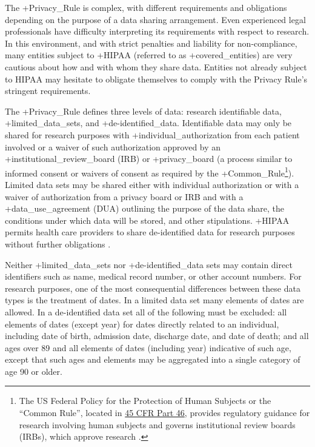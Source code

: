 \documentclass[
]{WileySix}
\begin{document}
The +Privacy\_Rule\textbar{} is complex, with different requirements and obligations depending on the purpose of a data sharing arrangement. Even experienced legal professionals have difficulty interpreting its requirements with respect to research. In this environment, and with strict penalties and liability for non-compliance, many entities subject to +HIPAA\textbar{} (referred to as +covered\_entities\textbar) are very cautious about how and with whom they share data. Entities not already subject to HIPAA may hesitate to obligate themselves to comply with the Privacy Rule's stringent requirements.

The +Privacy\_Rule\textbar{} defines three levels of data: research identifiable data, +limited\_data\_sets\textbar, and +de-identified\_data\textbar. Identifiable data may only be shared for research purposes with +individual\_authorization\textbar{} from each patient involved or a waiver of such authorization approved by an +institutional\_review\_board\textbar{} (IRB) or +privacy\_board\textbar{} (a process similar to informed consent or waivers of consent as required by the +Common\_Rule\textbar{}\footnote{The US Federal Policy for the Protection of Human Subjects or the ``Common Rule'', located in \href{https://www.hhs.gov/ohrp/regulations-and-policy/regulations/45-cfr-46/index.html}{45 CFR Part 46}, provides regulatory guidance for research involving human subjects and governs institutional review boards (IRBs), which approve research \citep{officeforhumanresearchprotections2018a}.}). Limited data sets may be shared either with individual authorization or with a waiver of authorization from a privacy board or IRB and with a +data\_use\_agreement\textbar{} (DUA) outlining the purpose of the data share, the conditions under which data will be stored, and other stipulations. +HIPAA\textbar{} permits health care providers to share de-identified data for research purposes without further obligations \citep{u.s.departmentofhealthhumanservices2018a}.

Neither +limited\_data\_sets\textbar{} nor +de-identified\_data\textbar{} sets may contain direct identifiers such as name, medical record number, or other account numbers. For research purposes, one of the most consequential differences between these data types is the treatment of dates. In a limited data set many elements of dates are allowed. In a de-identified data set all of the following must be excluded: all elements of dates (except year) for dates directly related to an individual, including date of birth, admission date, discharge date, and date of death; and all ages over 89 and all elements of dates (including year) indicative of such age, except that such ages and elements may be aggregated into a single category of age 90 or older.
\end{document}
